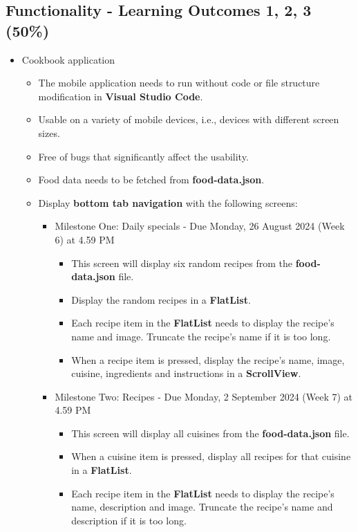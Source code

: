 \documentclass{article}
\begin{document}
\subsection*{Functionality - Learning Outcomes 1, 2, 3 (50\%)}
\begin{itemize}
  \item Cookbook application
  \begin{itemize}
    \item The mobile application needs to run without code or file structure modification in \textbf{Visual Studio Code}.
  \item Usable on a variety of mobile devices, i.e., devices with different screen sizes.
  \item Free of bugs that significantly affect the usability.
  \item Food data needs to be fetched from \textbf{food-data.json}.
  \item Display \textbf{bottom tab navigation} with the following screens:
  \begin{itemize}
    \item Milestone One: Daily specials - Due Monday, 26 August 2024 (Week 6) at 4.59 PM
    \begin{itemize}
      \item This screen will display six random recipes from the \textbf{food-data.json} file. 
      \item Display the random recipes in a \textbf{FlatList}.
      \item Each recipe item in the \textbf{FlatList} needs to display the recipe's name and image. Truncate the recipe's name if it is too long.
      \item When a recipe item is pressed, display the recipe's name, image, cuisine, ingredients and instructions in a \textbf{ScrollView}. 
    \end{itemize}
    \item Milestone Two: Recipes - Due Monday, 2 September 2024 (Week 7) at 4.59 PM
    \begin{itemize}
      \item This screen will display all cuisines from the \textbf{food-data.json} file.
      \item When a cuisine item is pressed, display all recipes for that cuisine in a \textbf{FlatList}.
      \item Each recipe item in the \textbf{FlatList} needs to display the recipe's name, description and image. Truncate the recipe's name and description if it is too long.

\end{itemize}
\end{itemize}
\end{itemize}
\end{itemize}
\end{document}
